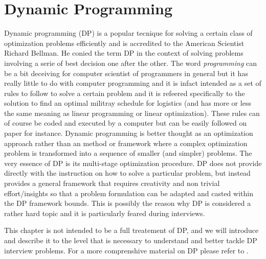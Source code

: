 \section*{Dynamic Programming}
\label{sect:appendix:DP}

Dynamic programming (DP) is a popular tecnique for solving a certain class of
optimization problems efficiently and is accredited to the American Scientist
Richard Bellman\cite{bellman1954}. He conied the term DP in the context of
solving problems involving a serie of best decision one after the other. 
The word \textit{programming} can be a bit deceiving for
computer scientist of programmers in general but it has really little to do with
computer programming and it is infact intended as a set of rules to 
follow to solve a certain problem and it is refeered specifically to the
solution to find an optimal militray schedule for logistics (and has more or
less the same meaning as linear programming or linear optimization).  These rules can of course be coded and
executed by a computer but can be easily followed on paper for instance. 
Dynamic programming is better thought as an optimization approach rather than an
method or framework where a complex optimization problem is transformed into a sequence of
smaller (and simpler) problems. The very essence of DP is its multi-stage
optimization procedure. DP does not provide directly with the
instruction on how to solve a particular problem, but instead provides a general
framework that requires creativity and non trivial effort/insights so that a
problem formulation can be adapted and casted within the DP framework bounds.
This is possibly the reason why DP is considered a rather hard topic and it is
particularly feared during interviews. 

This chapter is not intended to be a full treatement of DP, and we will
introduce and describe it to the level that is necessary to understand and
better tackle DP interview problems. For a more comprenshive material on DP
please refer to \cite{bellman1954, cormen2009}.

